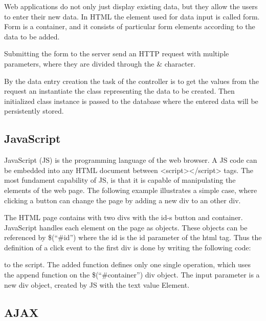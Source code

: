 Web applications do not only just display existing data, but they allow the users to enter their new data. In HTML the element used for data input is called form. Form is a container, and it consists of particular form elements according to the data to be added. 


Submitting the form to the server send an HTTP request with multiple parameters, where they are divided through the \& character.


By the data entry creation the task of the controller is to get the values from the request an instantiate the class representing the data to be created. Then initialized class instance is passed to the database where the entered data will be persistently stored.



\subsection{JavaScript}

JavaScript (JS) is the programming language of the web browser. A JS code can be embedded into any HTML document between <script></script> tags. The most fundament capability of JS, is that it is capable of manipulating the elements of the web page. The following example illustrates a simple case, where clicking a button can change the page by adding a new div to an other div.


The HTML page contains with two divs with the id-s button and container. JavaScript handles each element on the page as objects. These objects can be referenced by \$(“\#id”) where the id is the id parameter of the html tag. Thus the definition of a click event to the first div is done by writing the following code:


to the script. The added function defines only one single operation, which uses the append function on the \$(“\#container”) div object. The input parameter is a new div object, created by JS with the text value Element. 

\subsection{AJAX}

